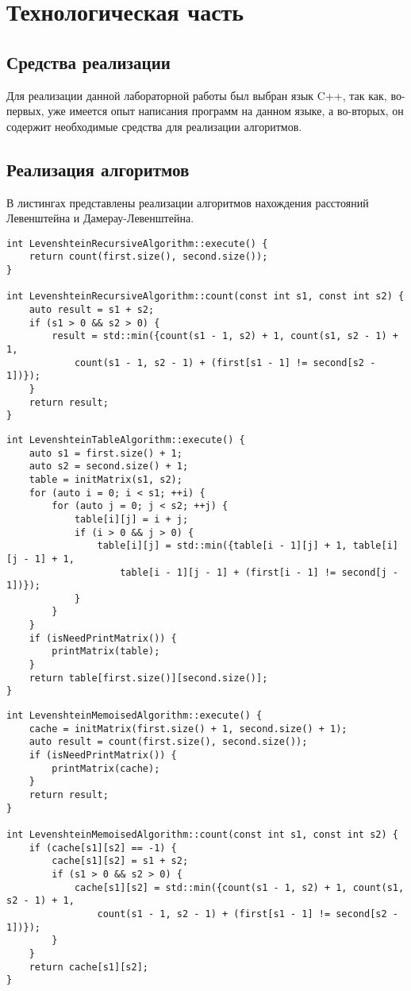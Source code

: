 \chapter{Технологическая часть}

\section{Средства реализации}

Для реализации данной лабораторной работы был выбран язык C++, так как, во-первых, уже имеется опыт написания программ на данном языке, а во-вторых, он содержит необходимые средства для реализации алгоритмов. 

\section{Реализация алгоритмов}

В листингах представлены реализации алгоритмов нахождения расстояний Левенштейна и Дамерау-Левенштейна.

\begin{lstlisting}[label=lst:levRec,caption=Метод рекурсивного нахождения расстояния Левенштейна]
int LevenshteinRecursiveAlgorithm::execute() {
	return count(first.size(), second.size());
}

int LevenshteinRecursiveAlgorithm::count(const int s1, const int s2) {
	auto result = s1 + s2;
	if (s1 > 0 && s2 > 0) {
		result = std::min({count(s1 - 1, s2) + 1, count(s1, s2 - 1) + 1, 
			count(s1 - 1, s2 - 1) + (first[s1 - 1] != second[s2 - 1])});
	}
	return result;
}
\end{lstlisting}

\begin{lstlisting}[label=lst:levItr,caption=Метод матричного нахождения расстояния Левенштейна]
int LevenshteinTableAlgorithm::execute() {
	auto s1 = first.size() + 1;
	auto s2 = second.size() + 1;
	table = initMatrix(s1, s2);
	for (auto i = 0; i < s1; ++i) {
		for (auto j = 0; j < s2; ++j) {
			table[i][j] = i + j;
			if (i > 0 && j > 0) {
				table[i][j] = std::min({table[i - 1][j] + 1, table[i][j - 1] + 1, 
					table[i - 1][j - 1] + (first[i - 1] != second[j - 1])});
			}
		}
	}
	if (isNeedPrintMatrix()) {
		printMatrix(table);
	} 
	return table[first.size()][second.size()];
}
\end{lstlisting}

\begin{lstlisting}[label=lst:levMem,caption=Метод рекурсивного нахождения расстояния Левенштейна с мемоизацией]
int LevenshteinMemoisedAlgorithm::execute() {
	cache = initMatrix(first.size() + 1, second.size() + 1);
	auto result = count(first.size(), second.size());
	if (isNeedPrintMatrix()) {
		printMatrix(cache);
	} 
	return result;
}

int LevenshteinMemoisedAlgorithm::count(const int s1, const int s2) {
	if (cache[s1][s2] == -1) {
		cache[s1][s2] = s1 + s2;
		if (s1 > 0 && s2 > 0) {
			cache[s1][s2] = std::min({count(s1 - 1, s2) + 1, count(s1, s2 - 1) + 1, 
				count(s1 - 1, s2 - 1) + (first[s1 - 1] != second[s2 - 1])});
		}
	}
	return cache[s1][s2];
}
\end{lstlisting}

